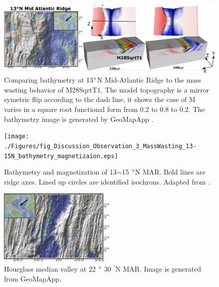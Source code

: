 \documentclass[draft,gc]{agutex}
\begin{document}
\begin{figure}[h]
\noindent\includegraphics[width=1.0\textwidth]{./Figures/fig_Discussion_Observation_1_13N_MAR_CutBack.eps}
 \caption[Comparing bathymetry at 13$\degree$N Mid-Atlantic Ridge to the mass wasting behavior of M28SqrtT1.]{Comparing bathymetry at 13$\degree$N Mid-Atlantic Ridge to the mass wasting behavior of M28SqrtT1. The model topography is a mirror symetric flip according to the dash line, it shows the case of M varies in a square root functional form from 0.2 to 0.8 to 0.2. The bathymetry image is generated by GeoMapApp \citep{Ryan2009}.}
 \label{fig_Discussion_Observation_1_13N_MAR_CutBack}
\end{figure}

\begin{figure}[h]
\noindent\texttt{[image: ./Figures/fig\_Discussion\_Observation\_3\_MassWasting\_13-15N\_bathymetry\_magnetizaion.eps]}
 \caption[Bathymetry and magnetization of 13$\sim$15 $\degree$N MAR.]{Bathymetry and magnetization of 13$\sim$15 $\degree$N MAR. Bold lines are ridge axes. Lined up circles are identified isochrons. Adapted from \citep{Smith2008}.}
 \label{fig_Discussion_Observation_3_MassWasting_13-15N_bathymetry_magnetizaion}
\end{figure}

\begin{figure}[h]
\noindent\includegraphics[width=0.5\textwidth]{./Figures/fig_Discussion_Observation_4_hourglass_22N_MAR.eps}
  \caption[Hourglass median valley at 22 $\degree$ 30 $^{\prime}$N MAR.]{Hourglass median valley at 22 $\degree$ 30 $^{\prime}$N MAR. Image is generated from GeoMapApp.}
 \label{fig_Discussion_Observation_4_hourglass_22N_MAR}
\end{figure}   
\end{document}
